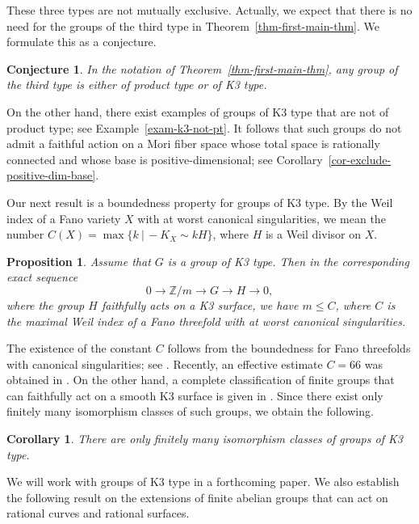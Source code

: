 \documentclass[11pt]{amsart}
\numberwithin{equation}{section}
\newtheorem{proposition}[thm]{Proposition}
\newtheorem{corollary}[thm]{Corollary}
\newtheorem{conjecture}[thm]{Conjecture}
\theoremstyle{definition}
\theoremstyle{remark}
\newcommand{\lra}{\longrightarrow}
\begin{document}
These three types are not mutually exclusive.  Actually, we expect
that there is no need for the groups of the third type in
Theorem~\ref{thm-first-main-thm}.  We formulate this as a conjecture. 

\begin{conjecture}
In the notation of Theorem~\ref{thm-first-main-thm}, any group of the third type is either of product type or of K3 type.
\end{conjecture}

On the other hand, there exist examples of groups of K3 type that are not of product type; see Example~\ref{exam-k3-not-pt}.  It follows that such groups do not admit a faithful action on a Mori fiber space whose total space is rationally connected and whose base is positive-dimensional; see Corollary~\ref{cor-exclude-positive-dim-base}.

Our next result is a boundedness property for groups of K3 type.  By the Weil index of a Fano variety $X$ with at worst canonical singularities, we mean the number $C(X)=\max\{ k\ |\, -K_X \sim k H\}$, where $H$ is a Weil divisor on $X$.

\begin{proposition}
\label{thm-second-main-thm}
Assume that $G$ is a group of K3 type. Then in the corresponding exact sequence\color{black}
\[
0\lra \mathbb{Z}/m\lra G \lra H\lra 0, 
\] 
where the group $H$ faithfully acts on a K3 surface, we have $m\leq C$, where $C$ is  the maximal Weil index of a  Fano threefold with at worst canonical singularities.   
\end{proposition}

The existence of the constant $C$ follows from the boundedness for Fano threefolds with canonical singularities; see \cite{B21}.  {Recently, an effective estimate $C=66$ was obtained in \cite{JL25}.}  On the other hand, a complete classification of finite groups that can faithfully act on a smooth K3 surface is given in \cite{BH23}. Since there exist only finitely many isomorphism classes of such groups, we obtain the following.

\begin{corollary}

There are only finitely many isomorphism classes of groups of K3 type.\color{black}
\end{corollary}

We will work with groups of K3 type in a forthcoming paper.  We also establish the following result on the extensions of finite abelian groups that can act on rational curves and rational surfaces.
\end{document}

